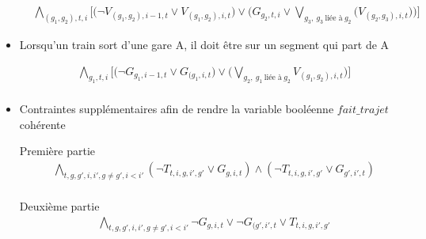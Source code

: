 \documentclass[a4paper]{article}
\begin{document}
\begin{itemize}
\begin{equation*}
    \begin{split}
      & \bigwedge_{(g_1, g_2), t, i}
      \big[
      \big(\neg V_{(g_1, g_2), i-1, t} \lor V_{(g_1, g_2), i, t} \big)
      \lor
      \big(G_{g_2, t, i} \lor \bigvee_{g_3,\ g_3\ \text{liée à}\ g_2} \big(V_{(g_2, g_3), i, t}\big) \big)
      \big]
      \end{split}
    \end{equation*}


\item Lorsqu'un train sort d'une gare A, il doit être sur un segment qui part de A

\begin{equation*}
    \begin{split}
      & \bigwedge_{g_1, t, i}
      \big[
      \big(\neg G_{g_1, i-1, t} \lor G_{(g_1, i, t} \big)
      \lor
      \big(\bigvee_{g_2,\ g_1\ \text{liée à}\ g_2} V_{(g_1, g_2), i, t}\big) 
      \big]\\
    \end{split}
    \end{equation*}
    
\item Contraintes supplémentaires afin de rendre la variable booléenne $fait\_trajet$ cohérente

Première partie \\
\begin{equation*}
    \begin{split}
      & \bigwedge_{t, g, g', i, i', g \neq g', i < i'}
      (\neg T_{t,i,g,i', g'} \lor G_{g, i, t} ) \land (\neg T_{t,i,g,i', g'} \lor  G_{g', i', t} )\\
    \end{split}
    \end{equation*}

Deuxième partie \\

\begin{equation*}
    \begin{split}
      & \bigwedge_{t, g, g', i, i', g \neq g', i < i'}
      \neg G_{g, i, t} \lor \neg G_{(g', i', t} \lor T_{t,i,g,i', g'} \\
    \end{split}
    \end{equation*}


\end{itemize}

\end{document}
